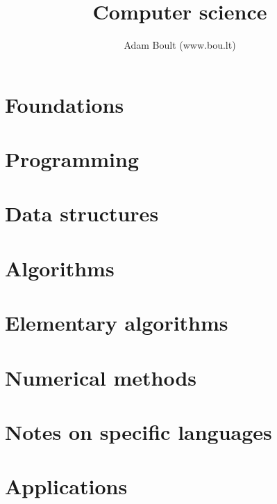 \documentclass[oneside]{book}
\begin{document}
\author{Adam Boult (www.bou.lt)}
\title{Computer science}
\maketitle

\setcounter{tocdepth}{1}
\tableofcontents



\part{Foundations}





\part{Programming}




\part{Data structures}





\part{Algorithms}




\part{Elementary algorithms}



\part{Numerical methods}









\part{Notes on specific languages}	







\part{Applications}



\end{document}
